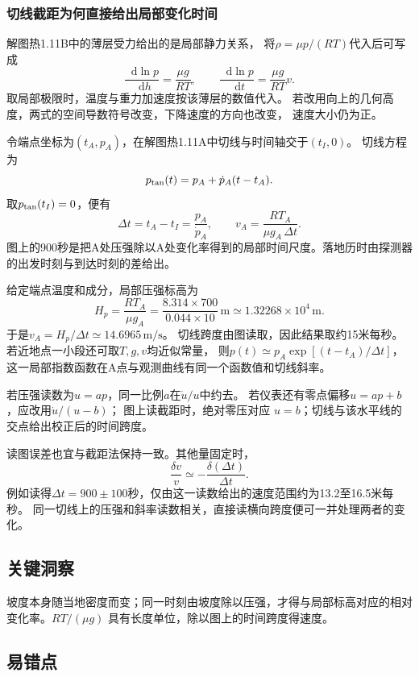 \documentclass[UTF8,fontset=fandol,a4paper,11pt]{ctexart}
\newcommand{\dd}{\mathop{}\!\mathrm{d}}
\begin{document}
\subsubsection*{切线截距为何直接给出局部变化时间}
解图热1.11B中的薄层受力给出的是局部静力关系，
将$\rho=\mu p/(RT)$代入后可写成
\[
\frac{\dd\ln p}{\dd h}=\frac{\mu g}{RT},\qquad
\frac{\dd\ln p}{\dd t}=\frac{\mu g}{RT}v.
\]
取局部极限时，温度与重力加速度按该薄层的数值代入。
若改用向上的几何高度，两式的空间导数符号改变，下降速度的方向也改变，
速度大小仍为正。

令端点坐标为$(t_A,p_A)$，在解图热1.11A中切线与时间轴交于$(t_I,0)$。
切线方程为
\[
p_{\rm tan}(t)=p_A+\dot p_A(t-t_A).
\]
取$p_{\rm tan}(t_I)=0$，便有
\[
\Delta t=t_A-t_I=\frac{p_A}{\dot p_A},\qquad
v_A=\frac{RT_A}{\mu g_A\,\Delta t}.
\]
图上的900秒是把A处压强除以A处变化率得到的局部时间尺度。落地历时由探测器的出发时刻与到达时刻的差给出。

给定端点温度和成分，局部压强标高为
\[
H_p=\frac{RT_A}{\mu g_A}
=\frac{8.314\times700}{0.044\times10}
\,\mathrm m\simeq1.32268\times10^4\,\mathrm m.
\]
于是$v_A=H_p/\Delta t\simeq14.6965\,\mathrm{m/s}$。
切线跨度由图读取，因此结果取约15米每秒。
若近地点一小段还可取$T,g,v$均近似常量，
则$p(t)\simeq p_A\exp[(t-t_A)/\Delta t]$，
这一局部指数函数在A点与观测曲线有同一个函数值和切线斜率。

若压强读数为$u=ap$，同一比例$a$在$\dot u/u$中约去。
若仪表还有零点偏移$u=ap+b$，应改用$\dot u/(u-b)$；
图上读截距时，绝对零压对应 $u=b$；切线与该水平线的交点给出校正后的时间跨度。

读图误差也宜与截距法保持一致。其他量固定时，
\[
\frac{\delta v}{v}\simeq-\frac{\delta(\Delta t)}{\Delta t}.
\]
例如读得$\Delta t=900\pm100$秒，仅由这一读数给出的速度范围约为13.2至16.5米每秒。
同一切线上的压强和斜率读数相关，直接读横向跨度便可一并处理两者的变化。




\subsection*{关键洞察}

坡度本身随当地密度而变；同一时刻由坡度除以压强，才得与局部标高对应的相对变化率。$RT/(\mu g)$ 具有长度单位，除以图上的时间跨度得速度。



\subsection*{易错点}
\end{document}
